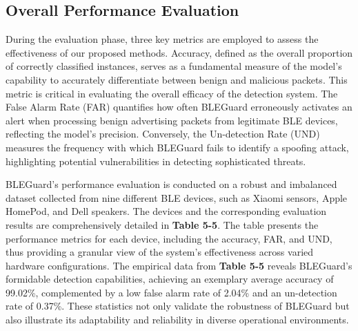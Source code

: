 

\subsection{Overall Performance Evaluation}

\noindent During the evaluation phase, three key metrics are employed to assess the effectiveness of our proposed methods. Accuracy, defined as the overall proportion of correctly classified instances, serves as a fundamental measure of the model's capability to accurately differentiate between benign and malicious packets. This metric is critical in evaluating the overall efficacy of the detection system. The False Alarm Rate (FAR) quantifies how often BLEGuard erroneously activates an alert when processing benign advertising packets from legitimate BLE devices, reflecting the model's precision. Conversely, the Un-detection Rate (UND) measures the frequency with which BLEGuard fails to identify a spoofing attack, highlighting potential vulnerabilities in detecting sophisticated threats.

\vspace{6pt}

BLEGuard's performance evaluation is conducted on a robust and imbalanced dataset collected from nine different BLE devices, such as Xiaomi sensors, Apple HomePod, and Dell speakers. The devices and the corresponding evaluation results are comprehensively detailed in \textbf{Table 5-5}. The table presents the performance metrics for each device, including the accuracy, FAR, and UND, thus providing a granular view of the system's effectiveness across varied hardware configurations. The empirical data from \textbf{Table 5-5} reveals BLEGuard's formidable detection capabilities, achieving an exemplary average accuracy of 99.02\%, complemented by a low false alarm rate of 2.04\% and an un-detection rate of 0.37\%. These statistics not only validate the robustness of BLEGuard but also illustrate its adaptability and reliability in diverse operational environments.

\vspace{4pt}

